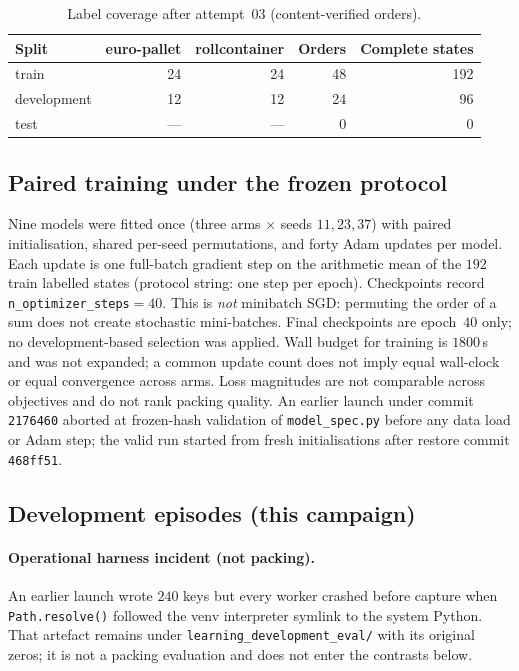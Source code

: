 \begin{table}[t]
\centering
\caption{Label coverage after attempt~03 (content-verified orders).}
\label{tab:label-coverage}
\begin{tabular}{lrrrr}
\toprule
Split & euro-pallet & rollcontainer & Orders & Complete states \\
\midrule
train & 24 & 24 & 48 & 192 \\
development & 12 & 12 & 24 & 96 \\
test & --- & --- & 0 & 0 \\
\bottomrule
\end{tabular}
\end{table}

\subsection{Paired training under the frozen protocol}

Nine models were fitted once (three arms $\times$ seeds $11,23,37$) with paired
initialisation, shared per-seed permutations, and forty Adam updates per model.
Each update is one full-batch gradient step on the arithmetic mean of the $192$
train labelled states (protocol string: one step per epoch). Checkpoints record
\texttt{n\_optimizer\_steps}${}=40$. This is \emph{not} minibatch SGD: permuting
the order of a sum does not create stochastic mini-batches. Final checkpoints are
epoch~$40$ only; no development-based selection was applied. Wall budget for
training is $1800$\,s and was not expanded; a common update count does not imply
equal wall-clock or equal convergence across arms. Loss magnitudes are not
comparable across objectives and do not rank packing quality. An earlier launch
under commit \texttt{2176460} aborted at frozen-hash validation of
\texttt{model\_spec.py} before any data load or Adam step; the valid run started
from fresh initialisations after restore commit \texttt{468ff51}.

\subsection{Development episodes (this campaign)}

\paragraph{Operational harness incident (not packing).}
An earlier launch wrote $240$ keys but every worker crashed before capture when
\texttt{Path.resolve()} followed the venv interpreter symlink to the system
Python. That artefact remains under \texttt{learning\_development\_eval/} with its
original zeros; it is not a packing evaluation and does not enter the contrasts
below.

